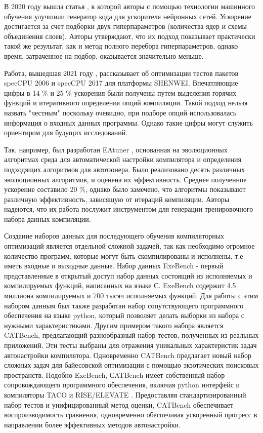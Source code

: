 В 2020 году вышла статья \cite{liu2020dlfusion}, в которой авторы с помощью технологии машинного обучения улучшили генератор кода для ускорителя нейронных сетей. Ускорение достигается за счет подборки двух гиперпараметров (количества ядер и схемы объединения слоев). Авторы утверждают, что их подход показывает практически такой же результат, как и метод полного перебора гиперпараметров, однако время, затраченное на подбор, оказывается значительно меньше. 

Работа, вышедшая 2021 году \cite{wei2021compiler}, рассказывает об оптимизации тестов пакетов specCPU 2006 и specCPU 2017 для платформы SHENWEI. Впечатляющие цифры в 14 \% и 25 \% ускорения были получены путем выделения горячих функций и итеративного определения опций компиляции. Такой подход нельзя назвать "честным" поскольку очевидно, при подборе опций использовалась информация о входных данных программы. Однако такие цифры могут служить ориентиром для будущих исследований. 

Так, например, был разработан EAtuner \cite{xiao2024eatuner}, основанная на эволюционных алгоритмах среда для автоматической настройки компилятора и определения подходящих алгоритмов для автотюнера. Было реализовано десять различных эволюционных алгоритмов, и оценена их эффективность. Среднее полученное ускорение составило 20 \%, однако было замечено, что алгоритмы показывают различную эффективность, зависящую от итераций компиляции. Авторы надеются, что их работа послужит инструментом для генерации тренировочного набора данных компиляции. 

Создание наборов данных для последующего обучения компиляторных оптимизаций является отдельной сложной задачей, так как необходимо огромное количество программ, которые могут быть скомпилированы и исполнены, т.е иметь входные и выходные данные. Набор данных ExeBench \cite{armengol2022exebench}  - первый представленные в открытый доступ набор данных состоящий из исполняемых и компилируемых функций, написанных на языке С. ExeBench содержит 4.5 миллиона компилируемых и 700 тысяч исполняемых функций. Для работы с этим набором данным был также разработан набор сопутствующего программного обеспечения на языке python, который позволяет делать выборки из набора с нужными характеристиками. Другим примером такого набора является CATBench, предлагающий разнообразный набор тестов, полученных из реальных приложений.
Эти тесты выбраны для отражения уникальных характеристик задач автонастройки компилятора.
Одновременно CATBench предлагает новый набор сложных задач для байесовской оптимизации с помощью
экзотических поисковых пространств. Подобно ExeBench, СATBench имеет собственный набор сопровождающего программного обеспечения, включая python интерфейс и компиляторы TACO \cite{kjolstad2017taco} и RISE/ELEVATE \cite{steuwer2022rise}.
Предоставляя стандартизированный набор тестов и унифицированный метод оценки, CATBench обеспечивает воспроизводимость сравнения, одновременно обеспечивая ускоренный прогресс в направлении более эффективных методов автонастройки.

